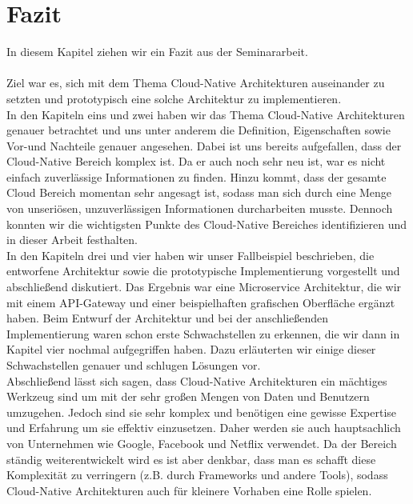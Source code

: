 \chapter{Fazit}

In diesem Kapitel ziehen wir ein Fazit aus der Seminararbeit.\\
\\
Ziel war es, sich mit dem Thema Cloud-Native Architekturen auseinander zu setzten und prototypisch eine solche Architektur zu implementieren.\\
In den Kapiteln eins und zwei haben wir das Thema Cloud-Native Architekturen genauer betrachtet und uns unter anderem die Definition, Eigenschaften sowie Vor-und Nachteile genauer angesehen. Dabei ist uns bereits aufgefallen, dass der Cloud-Native Bereich komplex ist. Da er auch noch sehr neu ist, war es nicht einfach zuverlässige Informationen zu finden. Hinzu kommt, dass der gesamte Cloud Bereich momentan sehr angesagt ist, sodass man sich durch eine Menge von unseriösen, unzuverlässigen Informationen durcharbeiten musste. Dennoch konnten wir die wichtigsten Punkte des Cloud-Native Bereiches identifizieren und in dieser Arbeit festhalten.\\
In den Kapiteln drei und vier haben wir unser Fallbeispiel beschrieben, die entworfene Architektur sowie die prototypische Implementierung vorgestellt und abschließend diskutiert. Das Ergebnis war eine Microservice Architektur, die wir mit einem API-Gateway und einer beispielhaften grafischen Oberfläche ergänzt haben. Beim Entwurf der Architektur und bei der anschließenden Implementierung waren schon erste Schwachstellen zu erkennen, die wir dann in Kapitel vier nochmal aufgegriffen haben. Dazu erläuterten wir einige dieser Schwachstellen genauer und schlugen Lösungen vor.\\
Abschließend lässt sich sagen, dass Cloud-Native Architekturen ein mächtiges Werkzeug sind um mit der sehr großen Mengen von Daten und Benutzern umzugehen. Jedoch sind sie sehr komplex und benötigen eine gewisse Expertise und Erfahrung um sie effektiv einzusetzen. Daher werden sie auch hauptsachlich von Unternehmen wie Google, Facebook und Netflix verwendet. Da der Bereich ständig weiterentwickelt wird es ist aber denkbar, dass man es schafft diese Komplexität zu verringern (z.B. durch Frameworks und andere Tools), sodass Cloud-Native Architekturen auch für kleinere Vorhaben eine Rolle spielen.